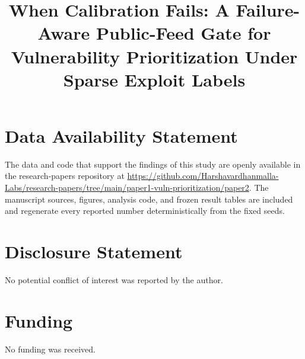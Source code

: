\documentclass[journal]{IEEEtran}
\title{When Calibration Fails: A Failure-Aware Public-Feed Gate for
Vulnerability Prioritization Under Sparse Exploit Labels}
\author{%
  \IEEEauthorblockN{Harshavardhan Malla}
  \IEEEauthorblockA{Independent Researcher\\
  harshavardhanmalla75@gmail.com}%
}
\begin{document}
\maketitle





















\section*{Data Availability Statement}
The data and code that support the findings of this study are openly available in the research-papers repository at \url{https://github.com/Harshavardhanmalla-Labs/research-papers/tree/main/paper1-vuln-prioritization/paper2}. The manuscript sources, figures, analysis code, and frozen result tables are included and regenerate every reported number deterministically from the fixed seeds.

\section*{Disclosure Statement}
No potential conflict of interest was reported by the author.

\section*{Funding}
No funding was received.
\end{document}
